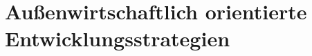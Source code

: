 


%


\chapter{Au{\ss}enwirtschaftlich orientierte Entwicklungsstrategien}\label{Entwicklungsstrategien}


